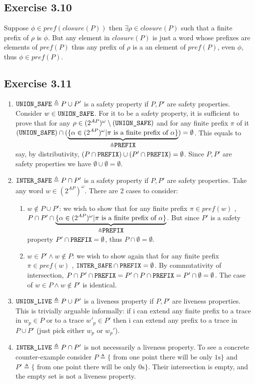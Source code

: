 \documentclass{article}
\begin{document}
	\subsection*{Exercise 3.10}
	Suppose $\phi \in pref(closure(P))$ then $\exists \rho \in closure(P)$ such that a finite prefix of $\rho$ is $\phi$. But any element in $closure(P)$ is just a word whose prefixes are elements of $pref(P)$ thus any prefix of $\rho$ is a an element of $pref(P)$, even $\phi$, thus $\phi \in pref(P)$.
	\subsection*{Exercise 3.11}
	\begin{enumerate}[label=\alph*)]
		\item $\verb|UNION_SAFE| \triangleq P \cup P'$ is a safety property if $P, P'$ are safety properties. Consider $w \in \verb|UNION_SAFE|$. For it to be a safety property, it is sufficient to prove that for any $\rho \in (2^{AP})^\omega \setminus (\verb|UNION_SAFE|)$ and for any finite prefix $\pi$ of it $(\verb|UNION_SAFE|) \cap (\underbrace{\{\alpha \in (2^{AP})^\omega| \pi \text{ is a finite prefix of } \alpha\}}_{\triangleq \verb|PREFIX|})=\emptyset$.
		This equals to say, by distributivity, $(P \cap \verb|PREFIX|) \cup (P' \cap \verb|PREFIX|) = \emptyset$. Since $P, P'$ are safety properties we have $\emptyset \cup \emptyset = \emptyset$.
		\item $\verb|INTER_SAFE| \triangleq P \cap P'$ is a safety property if $P, P'$ are safety properties. Take any word $w \in (2^{AP})^\omega$. There are 2 cases to consider:
		\begin{enumerate}[label=\roman*)]
			\item $w \notin P \cup P'$: we wish to show  that for any finite prefix $\pi \in pref(w)$ , $P \cap P' \cap \underbrace{\{\alpha \in (2^{AP})^\omega | \pi \text { is a finite prefix of } \alpha\}}_{\triangleq \verb|PREFIX|}$. But since $P'$ is a safety property $P' \cap \verb|PREFIX|=\emptyset$, thus $P \cap \emptyset = \emptyset$.
			\item $w \in P' \land w \notin P$: we wish to show again that for any finite prefix $\pi \in pref(w)$ , $\verb|INTER_SAFE| \cap \verb|PREFIX| = \emptyset$. By commutativity of intersection, $P \cap P' \cap \verb|PREFIX| = P' \cap P \cap \verb|PREFIX| = P' \cap \emptyset = \emptyset$. The case of $w \in P \land w \notin P'$ is identical.
		\end{enumerate} 
	\item $\verb|UNION_LIVE| \triangleq P \cup P'$ is a liveness property if $P, P'$ are liveness properties. This is trivially arguable informally: if i can extend any finite prefix to a trace in $w_p \in P$ or to a trace $w'_{p} \in P'$ then i can extend any prefix to a trace in $P \cup P'$ (just pick either $w_p$ or $w_p'$).
	\item $\verb|INTER_LIVE| \triangleq P \cap P'$ is not necessarily a liveness property. To see a concrete counter-example consider $P\triangleq \{\text{ from one point there will be only 1s}\}$ and $P' \triangleq \{\text{ from one point there will be only 0s}\}$. Their intersection is empty, and the empty set is not a liveness property.		
	\end{enumerate}
\end{document}
